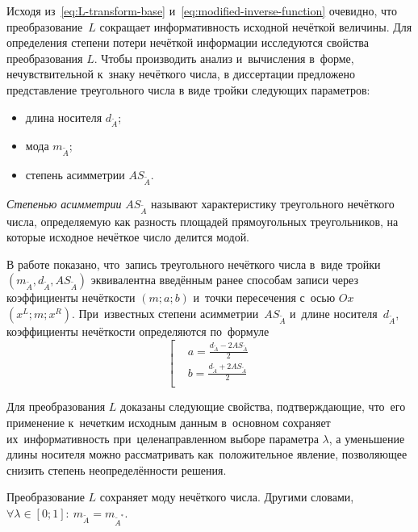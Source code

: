 Исходя из~\eqref{eq:L-transform-base} и~\eqref{eq:modified-inverse-function} очевидно, что преобразование~$L$ сокращает информативность исходной нечёткой величины. Для определения степени потери нечёткой информации исследуются свойства преобразования $L$. Чтобы производить анализ и~вычисления в~форме, нечувствительной к~знаку нечёткого числа, в диссертации предложено представление треугольного числа в виде тройки следующих параметров:
\begin{itemize}
  \item длина носителя $d_{\tilde A}$;
  \item мода $m_{\tilde A}$;
  \item степень асимметрии $AS_{\tilde A}$.
\end{itemize}

\textit{Степенью асимметрии} $AS_{\tilde A}$ называют характеристику треугольного нечёткого числа, определяемую как разность площадей прямоугольных треугольников, на которые исходное нечёткое число делится модой.

В работе показано, что~запись треугольного нечёткого числа в~виде тройки $\left(m_{\tilde A}, d_{\tilde A}, AS_{\tilde A} \right)$ эквивалентна введённым ранее способам записи через коэффициенты нечёткости $\left( m;a;b \right)$ и~точки пересечения с~осью $Ox$ $\left( x^L;m;x^R \right)$. При~известных степени асимметрии~$AS_{\tilde A}$ и~длине носителя~$d_{\tilde A}$, коэффициенты нечёткости определяются по~формуле
\begin{equation*}
	\left[ \begin{aligned}
      & a=\frac{d_{\tilde A}-2AS_{\tilde A}}{2} \\ 
      & b=\frac{d_{\tilde A}+2AS_{\tilde A}}{2} \\ 
    \end{aligned} \right.
\end{equation*}

Для преобразования $L$ доказаны следующие свойства, подтверждающие, что~его применение к~нечетким исходным данным в~основном сохраняет их~информативность при~целенаправленном выборе параметра $\lambda$, а уменьшение длины носителя можно рассматривать как~положительное явление, позволяющее снизить степень неопределённости решения.

\begin{prop}
\label{prop:L-prop1}
Преобразование $L$ сохраняет моду нечёткого числа. Другими словами, $\forall \lambda \in \left[ 0;1 \right]:\ m_{\tilde A}=m_{\tilde A^{*}}$.
\end{prop}

